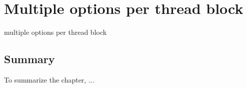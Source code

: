 \chapter{Multiple options per thread block}
\label{chapter:multoptionsperthreadblock}
multiple options per thread block

\section*{Summary}
To summarize the chapter, ...